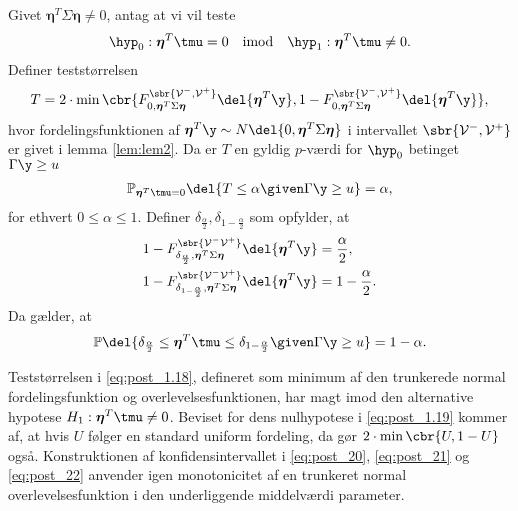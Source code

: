 \begin{lem} \label{lem:lem4}
Givet \(\boldsymbol{\eta}^T \Sigma \boldsymbol{\eta} \neq 0\), antag at vi vil teste
\begin{align*}
\hyp_0: \boldsymbol{\eta}^T \tmu=0 \quad \text{imod} \quad \hyp_1: \boldsymbol{\eta}^T \tmu \neq 0.
\end{align*}
Definer teststørrelsen
\begin{align}
T=2 \cdot \min\cbr{F_{0, \boldsymbol{\eta}^T \Sigma \boldsymbol{\eta}}^{\sbr{\mathcal{V}^-, \mathcal{V}^+}} \del{\boldsymbol{\eta}^T \y}, 1 - F_{0, \boldsymbol{\eta}^T \Sigma \boldsymbol{\eta}}^{\sbr{\mathcal{V}^-, \mathcal{V}^+}} \del{\boldsymbol{\eta}^T \y}}, \label{eq:post_1.18}
\end{align}
hvor fordelingsfunktionen af \(\boldsymbol{\eta}^T \y \sim N \del{0,  \boldsymbol{\eta}^T \Sigma \boldsymbol{\eta}}\) i intervallet \(\sbr{\mathcal{V}^-, \mathcal{V}^+}\) er givet i lemma \ref{lem:lem2}.
Da er \(T\) en gyldig \(p\)-værdi for \(\hyp_0\) betinget \(\Gamma \y \geq u\)
\begin{align}
\mathbb{P}_{\boldsymbol{\eta}^T \tmu=0} \del{T \leq \alpha \given \Gamma \y \geq u} = \alpha, \label{eq:post_1.19}
\end{align}
for ethvert \(0 \leq \alpha \leq 1\). 
Definer \(\delta_{\frac{\alpha}{2}}, \delta_{1-\frac{\alpha}{2}}\) som opfylder, at
\begin{align}
1-F_{\delta_{\frac{\alpha}{2}}, \boldsymbol{\eta}^T \Sigma \boldsymbol{\eta}}^{\sbr{\mathcal{V}^- \mathcal{V}^+}} \del{\boldsymbol{\eta}^T \y} &= \frac{\alpha}{2}, \label{eq:post_20} \\
1-F_{\delta_{1-\frac{\alpha}{2}}, \boldsymbol{\eta}^T \Sigma \boldsymbol{\eta} }^{\sbr{\mathcal{V}^- \mathcal{V}^+}} \del{\boldsymbol{\eta}^T \y} &= 1-\frac{\alpha}{2}. \label{eq:post_21}
\end{align}
Da gælder, at
\begin{align}
\mathbb{P} \del{\delta_{\frac{\alpha}{2}} \leq  \boldsymbol{\eta}^T \tmu \leq \delta_{1-\frac{\alpha}{2}} \given \Gamma \y \geq u} = 1- \alpha. \label{eq:post_22}
\end{align}
\end{lem}
%
Teststørrelsen i \eqref{eq:post_1.18}, defineret som minimum af den trunkerede normal fordelingsfunktion og overlevelsesfunktionen, har magt imod den alternative hypotese \(H_1: \boldsymbol{\eta}^T \tmu \neq 0\).
Beviset for dens nulhypotese i \eqref{eq:post_1.19} kommer af, at hvis \(U\) følger en standard uniform fordeling, da gør \(2 \cdot \min \cbr{U,1-U}\) også.
Konstruktionen af konfidensintervallet i \eqref{eq:post_20}, \eqref{eq:post_21} og \eqref{eq:post_22} anvender igen monotonicitet af en trunkeret normal overlevelsesfunktion i den underliggende middelværdi parameter.

